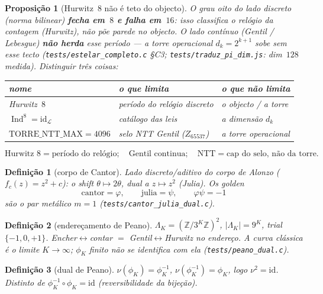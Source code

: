 \documentclass[11pt,a4paper]{article}
\newtheorem{definicao}{Definição}
\newtheorem{proposicao}{Proposição}
\newcommand{\code}[1]{\texttt{#1}}
\begin{document}
\begin{proposicao}[Hurwitz~8 não é teto do objecto]\label{prop:sem-teto}
O grau oito do lado discreto (norma bilinear) \textbf{fecha em~$8$ e
falha em~$16$}: isso classifica o relógio da contagem (Hurwitz), não
põe parede no objecto. O lado contínuo (Gentil / Lebesgue) \textbf{não
herda} esse período --- a torre operacional $d_k=2^{k+1}$ sobe sem
esse tecto (\code{tests/estelar\_completo.c} §C3; \code{tests/traduz\_pi\_dim.js}:
dim~$128$ medida). Distinguir três coisas:
\begin{center}\small
\begin{tabular}{@{}lll@{}}
nome & o que limita & o que \textbf{não} limita \\
\hline
Hurwitz~$8$ & período do relógio discreto & o objecto / a torre \\
$\operatorname{Ind}^{8}=\mathrm{id}_{\mathcal L}$ & catálogo das leis & a dimensão $d_k$ \\
$\mathrm{TORRE\_NTT\_MAX}=4096$ & selo NTT Gentil ($Z_{65537}$) & a torre operacional \\
\end{tabular}
\end{center}
\[
\boxed{
\text{Hurwitz~8}=\text{período do relógio};\quad
\text{Gentil continua};\quad
\text{NTT}=\text{cap do selo, não da torre}.
}
\]
\end{proposicao}

\begin{definicao}[corpo de Cantor]\label{def:cantor}
Lado discreto/aditivo do corpo de Alonzo ($f_c(z)=z^{2}+c$): o shift
$\theta\mapsto2\theta$, dual a $z\mapsto z^{2}$ (Julia). Os golden
\[
\mathrm{cantor}=\varphi,\qquad
\mathrm{julia}=\psi,\qquad
\varphi\psi=-1
\]
são o par metálico $m=1$ (\code{tests/cantor\_julia\_dual.c}).
\end{definicao}

\begin{definicao}[endereçamento de Peano]\label{def:peano}
$\Lambda_K=(\mathbb{Z}/3^{K}\mathbb{Z})^{2}$, $|\Lambda_K|=9^{K}$,
trial $\{-1,0,+1\}$. Encher$\leftrightarrow$contar $=$
Gentil$\leftrightarrow$Hurwitz no endereço. A curva clássica é o
limite $K\to\infty$; $\phi_K$ finito não se identifica com ela
(\code{tests/peano\_dual.c}).
\end{definicao}

\begin{definicao}[dual de Peano]\label{def:nu}
$\nu(\phi_K)=\phi_K^{-1}$, $\nu(\phi_K^{-1})=\phi_K$, logo
$\nu^{2}=\mathrm{id}$. Distinto de $\phi_K^{-1}\circ\phi_K=\mathrm{id}$
(reversibilidade da bijeção).
\end{definicao}
\end{document}
